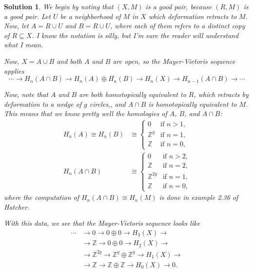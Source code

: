 \documentclass{article}
\theoremstyle{plain}
\theoremstyle{nonumberplain}
\newtheorem{sol}{Solution}
\newcommand{\Z}{\mathbb{Z}}
\begin{document}
\begin{sol}
We begin by noting that $(X,M)$ is a good pair, because $(R, M)$ is a good pair. Let $U$ be a neighborhood of $M$ in $X$ which deformation retracts to $M$. Now, let $A = R \cup U$ and $B = R \cup U$, where each of them refers to a distinct copy of $R \subseteq X$. I know the notation is silly, but I'm sure the reader will understand what I mean.

Now, $X = A \cup B$ and both $A$ and $B$ are open, so the Mayer-Vietoris sequence applies
\begin{equation}
\cdots \to H_n(A \cap B) \to H_n(A) \oplus H_n(B) \to H_n(X) \to H_{n-1}(A \cap B) \to \cdots
\end{equation}

Now, note that $A$ and $B$ are both homotopically equivalent to $R$, which retracts by deformation to a wedge of $g$ circles,, and $A \cap B$ is homotopically equivalent to $M$. This means that we know pretty well the homologies of $A$, $B$, and $A \cap B$:
\begin{equation}
\begin{aligned}
H_n(A) \cong H_n(B) &\cong \begin{cases}
0 & \text{if $n > 1$,}\\
\Z^g & \text{if $n = 1$,}\\
\Z & \text{if $n = 0$,}
\end{cases}\\
H_n(A \cap B) &\cong \begin{cases}
0 & \text{if $n > 2$,}\\
\Z & \text{if $n = 2$,}\\
\Z^{2g} & \text{if $n = 1$,}\\
\Z & \text{if $n = 0$,}
\end{cases}
\end{aligned}
\end{equation}
where the computation of $H_n(A \cap B) \cong H_n(M)$ is done in example 2.36 of Hatcher.

With this data, we see that the Mayer-Vietoris sequence looks like
\begin{equation}
\begin{aligned}
\cdots &\to 0 \to 0 \oplus 0 \to H_3(X) \to \\
&\to \Z \to 0 \oplus 0 \to H_2(X) \to\\
&\to \Z^{2g} \to \Z^{g} \oplus \Z^{g} \to H_1(X) \to\\
&\to \Z \to \Z \oplus \Z \to H_0(X) \to 0.
\end{aligned}
\end{equation}


\end{sol}
\end{document}
